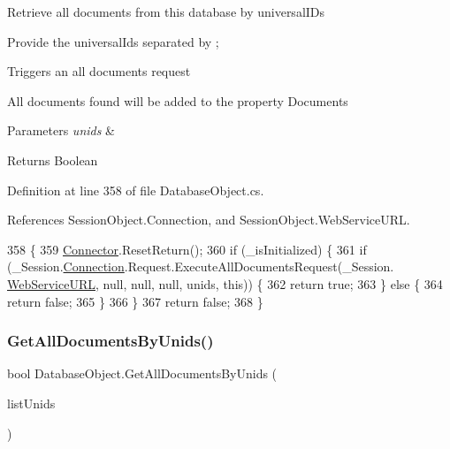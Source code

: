 Retrieve all documents from this database by universal\+I\+Ds 

Provide the universal\+Ids separated by ;

Triggers an all documents request

All documents found will be added to the property \textquotesingle{}Documents\textquotesingle{}


\begin{DoxyParams}{Parameters}
{\em unids} & \\
\hline
\end{DoxyParams}
\begin{DoxyReturn}{Returns}
Boolean
\end{DoxyReturn}


Definition at line 358 of file Database\+Object.\+cs.



References Session\+Object.\+Connection, and Session\+Object.\+Web\+Service\+U\+RL.


\begin{DoxyCode}
358                                                      \{
359         \hyperlink{class_connector}{Connector}.ResetReturn();
360         \textcolor{keywordflow}{if} (\_isInitialized) \{
361             \textcolor{keywordflow}{if} (\_Session.\hyperlink{class_session_object_a014bdbf705a753540e19bfb53030c55c}{Connection}.Request.ExecuteAllDocumentsRequest(\_Session.
      \hyperlink{class_session_object_a697c071c812fbf7ad1166b896fb44c16}{WebServiceURL}, null, null, null, unids, \textcolor{keyword}{this})) \{
362                 \textcolor{keywordflow}{return} \textcolor{keyword}{true};
363             \} \textcolor{keywordflow}{else} \{
364                 \textcolor{keywordflow}{return} \textcolor{keyword}{false};
365             \}
366         \}
367         \textcolor{keywordflow}{return} \textcolor{keyword}{false};
368     \}
\end{DoxyCode}
\mbox{\label{class_database_object_a92e80ea30e83cddf47f29d0f502b81c5}} 
\subsubsection{\texorpdfstring{Get\+All\+Documents\+By\+Unids()}{GetAllDocumentsByUnids()}\hspace{0.1cm}{\footnotesize\ttfamily [2/2]}}
{\footnotesize\ttfamily bool Database\+Object.\+Get\+All\+Documents\+By\+Unids (\begin{DoxyParamCaption}\item[{I\+List}]{list\+Unids }\end{DoxyParamCaption})}



